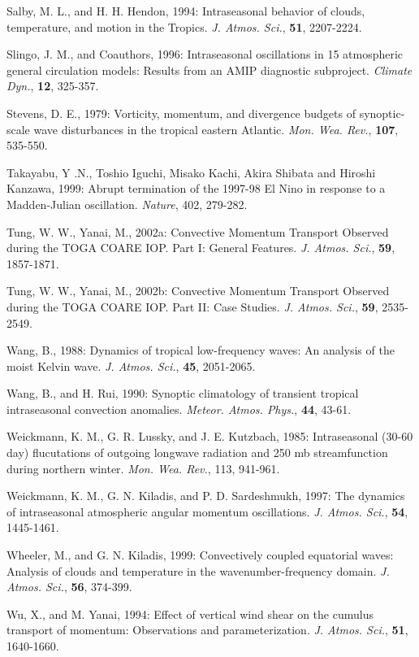 \documentclass[12pt]{article}
\begin{document}
Salby, M. L., and H. H. Hendon, 1994: Intraseasonal behavior of clouds,
temperature,
and motion in the Tropics.
{\it J. Atmos. Sci.}, {\bf 51}, 2207-2224.

Slingo, J. M., and Coauthors, 1996: Intraseasonal oscillations in 15 atmospheric
general circulation models: Results from an AMIP diagnostic subproject.
{\it Climate
 Dyn.}, {\bf 12}, 325-357.

Stevens, D. E., 1979: Vorticity, momentum, and divergence budgets of
synoptic-scale wave disturbances in the tropical eastern Atlantic.
{\it Mon. Wea. Rev.}, {\bf 107}, 535-550.

Takayabu, Y .N., Toshio Iguchi, Misako Kachi, Akira Shibata and
           Hiroshi Kanzawa, 1999:
Abrupt termination of the 1997-98 El Nino in response to a
Madden-Julian oscillation.
{\it Nature}, 402, 279-282.

Tung, W. W., Yanai, M., 2002a: Convective Momentum Transport Observed during 
the TOGA COARE IOP. Part I: General Features. {\it J. Atmos. Sci.}, {\bf 59}, 
1857-1871.

Tung, W. W., Yanai, M., 2002b: Convective Momentum Transport Observed during 
the TOGA COARE IOP. Part II: Case Studies. {\it J. Atmos. Sci.}, {\bf 59}, 
2535-2549.

Wang, B., 1988: Dynamics of tropical low-frequency waves: An analysis of the
moist Kelvin wave.
{\it J. Atmos. Sci.}, {\bf 45}, 2051-2065.

Wang, B., and H. Rui, 1990: Synoptic climatology of transient tropical
intraseasonal convection anomalies.
{\it Meteor. Atmos. Phys.}, {\bf 44}, 43-61.

Weickmann, K. M., G. R. Lussky, and J. E. Kutzbach, 1985: Intraseasonal (30-60
day) flucutations of outgoing longwave radiation and 250 mb streamfunction
during
northern winter. {\it Mon. Wea. Rev.}, 113, 941-961.

Weickmann, K. M., G. N. Kiladis, and P. D. Sardeshmukh, 1997: The dynamics of 
intraseasonal atmospheric angular momentum oscillations. 
{\it J. Atmos. Sci.}, {\bf 54}, 1445-1461.

Wheeler, M., and G. N. Kiladis, 1999: Convectively coupled equatorial waves:
Analysis
of clouds and temperature in the wavenumber-frequency domain.
{\it J. Atmos. Sci.}, {\bf 56}, 374-399.

Wu, X., and M. Yanai, 1994: Effect of vertical wind shear on the cumulus
transport of momentum: Observations and parameterization.
{\it J. Atmos. Sci.}, {\bf 51}, 1640-1660.
\end{document}
